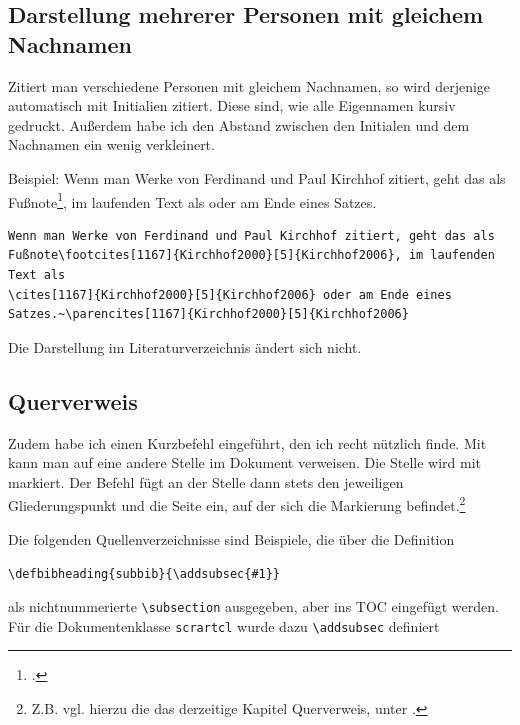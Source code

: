 \subsection{Darstellung mehrerer Personen mit gleichem Nachnamen}

Zitiert man verschiedene Personen mit gleichem Nachnamen, so wird derjenige automatisch mit Initialien zitiert. 
Diese sind, wie alle Eigennamen kursiv gedruckt. Außerdem habe ich den Abstand zwischen den Initialen und dem Nachnamen ein wenig verkleinert.

Beispiel: Wenn man Werke von Ferdinand und Paul Kirchhof zitiert, geht das als Fußnote\footcites[1167]{Kirchhof2000}[5]{Kirchhof2006},
im laufenden Text als \cites[1167]{Kirchhof2000}[5]{Kirchhof2006} oder am Ende eines Satzes.~\parencites[1167]{Kirchhof2000}[5]{Kirchhof2006}

\begin{lstlisting}[frame=single,xleftmargin=\fboxsep,xrightmargin=\fboxsep]
Wenn man Werke von Ferdinand und Paul Kirchhof zitiert, geht das als 
Fußnote\footcites[1167]{Kirchhof2000}[5]{Kirchhof2006}, im laufenden Text als 
\cites[1167]{Kirchhof2000}[5]{Kirchhof2006} oder am Ende eines 
Satzes.~\parencites[1167]{Kirchhof2000}[5]{Kirchhof2006}
\end{lstlisting}



Die Darstellung im Literaturverzeichnis ändert sich nicht.


\subsection{Querverweis}
\label{querverweis}


Zudem habe ich einen Kurzbefehl eingeführt, den ich recht nützlich finde. Mit  kann 
man auf eine andere Stelle im Dokument verweisen. Die Stelle wird mit  markiert. 
Der Befehl  fügt an der Stelle dann stets den jeweiligen Gliederungspunkt und 
die Seite ein, auf der sich die Markierung befindet.\footnote{Z.B. vgl. hierzu die das derzeitige Kapitel 
Querverweis, unter .}



Die folgenden Quellenverzeichnisse sind Beispiele, die über die Definition

\verb|\defbibheading{subbib}{\addsubsec{#1}}|

als nichtnummerierte \verb|\subsection| ausgegeben, aber ins TOC eingefügt werden.
Für die Dokumentenklasse \texttt{scrartcl} wurde dazu \verb|\addsubsec| definiert

